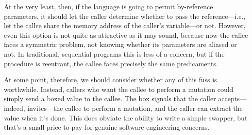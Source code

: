 At the very least, then, if the language is going to permit by-reference
parameters, it should let the caller determine whether to pass the
reference—i.e., let the callee share the memory address of the caller’s
variable—or not. However, even this option is not quite as attractive as it may
sound, because now the callee faces a symmetric problem, not knowing whether its
parameters are aliased or not. In traditional, sequential programs this is less
of a concern, but if the procedure is reentrant, the callee faces precisely the
same predicaments.

At some point, therefore, we should consider whether any of this fuss is
worthwhile. Instead, callers who want the callee to perform a mutation could
simply send a boxed value to the callee. The box signals that the caller
accepts—indeed, invites—the callee to perform a mutation, and the caller can
extract the value when it’s done. This does obviate the ability to write a
simple swapper, but that’s a small price to pay for genuine software engineering
concerns.
